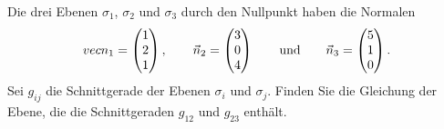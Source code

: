 Die drei Ebenen $\sigma_1$, $\sigma_2$ und $\sigma_3$ durch den Nullpunkt
haben die Normalen
\[
\\vec n_1=
\begin{pmatrix}1\\2\\1\end{pmatrix},
\qquad
\vec n_2=
\begin{pmatrix}3\\0\\4\end{pmatrix}
\qquad\text{und}\qquad
\vec n_3=
\begin{pmatrix}5\\1\\0\end{pmatrix}.
\]
Sei $g_{ij}$ die Schnittgerade der Ebenen $\sigma_i$ und $\sigma_j$.
Finden Sie die Gleichung der Ebene, die die Schnittgeraden $g_{12}$
und $g_{23}$ enthält.


